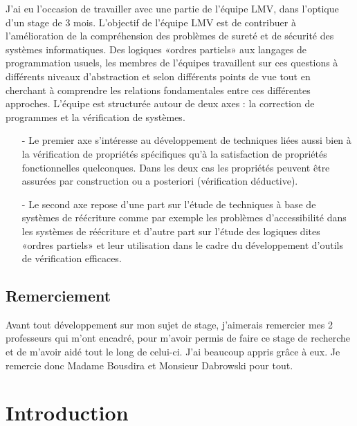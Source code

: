 \documentclass[10pt,a4paper]{report}
\begin{document}
J'ai eu l'occasion de travailler avec une partie de l'équipe LMV, dans l'optique d'un stage de 3 mois.
L'objectif de l'équipe LMV est de contribuer à l'amélioration de la compréhension des problèmes de sureté et de sécurité des systèmes  informatiques. Des logiques «ordres partiels» aux langages de programmation usuels, les membres de l'équipes travaillent sur ces questions à différents niveaux d'abstraction et selon différents points de vue tout en cherchant à comprendre les relations fondamentales entre ces différentes approches. L'équipe est structurée autour de deux axes : la correction de programmes et la vérification de systèmes.
\begin{enumerate}
\item[-] Le premier axe s'intéresse au développement de techniques liées aussi bien à la vérification de propriétés spécifiques qu'à la satisfaction de propriétés fonctionnelles quelconques. Dans les deux cas les propriétés peuvent être assurées par construction ou a posteriori (vérification déductive).
\item[-] Le second axe repose d'une part sur l'étude de techniques à base de systèmes de réécriture comme par exemple les problèmes d'accessibilité dans les systèmes de réécriture et d'autre part sur l'étude des logiques dites «ordres partiels» et leur utilisation dans le cadre du développement d'outils de vérification efficaces.
\end{enumerate}

\vfill

\section*{Remerciement}
Avant tout développement sur mon sujet de stage, j'aimerais remercier mes 2 professeurs qui m'ont encadré, pour m'avoir permis de faire ce stage de recherche et de m'avoir aidé tout le long de celui-ci. J'ai beaucoup appris grâce à eux. Je remercie donc Madame Bousdira et Monsieur Dabrowski pour tout.



\chapter{Introduction}
\end{document}
